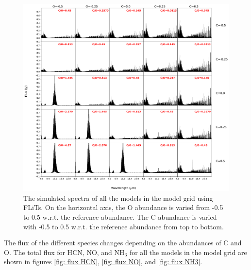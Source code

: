 \documentclass[oneside, single, authoryear, semicolon]{lion-msc}
\newcommand{\4}{$_4$}
\newcommand{\3}{$_3$}
\newcommand{\2}{$_2$}
\begin{document}
\begin{figure}[!ht]
    \centering
    \includegraphics[width=\linewidth]{Figures/All_spectra.pdf}
    \caption{The simulated spectra of all the models in the model grid using FLiTs. On the horizontal axis, the O abundance is varied from -0.5 to 0.5 w.r.t. the reference abundance. The C abundance is varied with -0.5 to 0.5 w.r.t. the reference abundance from top to bottom.}
    \label{fig: all spectra}
\end{figure}

The flux of the different species changes depending on the abundances of C and O. The total flux for HCN, NO, and NH\3 for all the models in the model grid are shown in figures \ref{fig: flux HCN}, \ref{fig: flux NO}, and \ref{fig: flux NH3}. 


\end{document}
